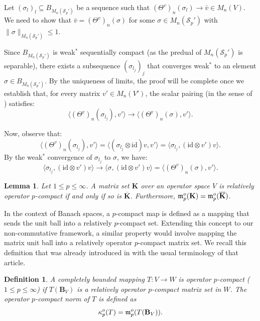 \documentclass[11pt]{amsart}
\newtheorem{lemma}[theorem]{Lemma}
\newtheorem{definition}[theorem]{Definition}
\numberwithin{equation}{section}
\begin{document}
Let $(\sigma_l)_l \subseteq B_{M_n(\mathcal{S}_{p}')}$ be a sequence such that $(\Theta^v)_n(\sigma_l) \to \bar{v} \in M_n(V)$. We need to show that $\bar{v} = (\Theta^v)_n(\sigma)$ for some $\sigma \in M_n(\mathcal{S}_{p}')$ with $\|\sigma\|_{M_n(\mathcal{S}_{p}')} \leq 1$.  

Since $B_{M_n(\mathcal{S}_{p}')}$ is weak$^*$ sequentially compact (as the predual of $M_n(\mathcal{S}_{p}')$ is separable), there exists a subsequence $(\sigma_{l_j})_j$ that converges weak$^*$ to an element $\sigma \in B_{M_n(\mathcal{S}_{p}')}$. By the uniqueness of limits, the proof will be complete once we establish that, for every matrix $v' \in M_n(V')$, the scalar pairing (in the sense of \cite[1.1.24]{Effros-Ruan-book}) satisfies:  
\[
\langle (\Theta^v)_n(\sigma_{l_j}), v' \rangle \to \langle (\Theta^v)_n(\sigma), v' \rangle.
\]  

Now, observe that:  
\[
\langle (\Theta^v)_n(\sigma_{l_j}), v' \rangle = \langle (\sigma_{l_j} \otimes \mathrm{id})v, v' \rangle = \langle \sigma_{l_j}, (\mathrm{id} \otimes v')v \rangle.  
\]  
By the weak$^*$ convergence of $\sigma_{l_j}$ to $\sigma$, we have:  
\[
\langle \sigma_{l_j}, (\mathrm{id} \otimes v')v \rangle \to \langle \sigma, (\mathrm{id} \otimes v')v \rangle = \langle (\Theta^v)_n(\sigma), v' \rangle.
\]  



\begin{lemma}\label{lemma-p-compact-closure}
Let $1 \le p \le \infty$.
A matrix set $\mathbf{K}$ over an operator space $V$ is relatively operator $p$-compact if and only if so is $\overline{\mathbf{K}}$. Furthermore, $\frak m_p^o(\mathbf{K}) = \frak m_p^o(\overline{\mathbf{K}})$.
\end{lemma}


In the context of Banach spaces, a $p$-compact map is defined as a mapping that sends the unit ball into a relatively $p$-compact set. Extending this concept to our non-commutative framework, a similar property would involve mapping the matrix unit ball into a relatively operator $p$-compact matrix set. We recall this definition that was already introduced in \cite{ChaDiGa-Operator-p-compact} with the usual terminology of that article.


\begin{definition} \label{defn: operator p-compact maps}
A completely bounded mapping  $T: V \to W$  is operator $p$-compact ($1\le p\le \infty$) if $T(\mathbf{B}_V)$ is a relatively operator $p$-compact matrix set in $W$. The operator $p$-compact norm of $T$ is defined as   
\begin{equation}\label{kpo}
\kappa_p^o(T) = \frak m_p^o( T(\mathbf{B}_V) ).
\end{equation}

\end{definition}
\end{document}
